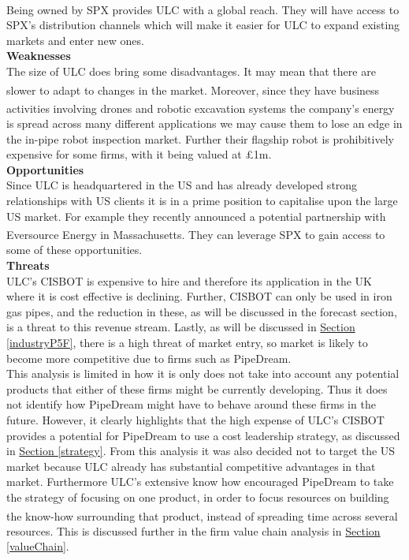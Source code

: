 \documentclass[11pt]{article}		%
\newcommand{\supercite}[1]{\textsuperscript{\cite{#1}}}		%
\newcommand{\sectref}[1]{\hyperref[#1]{Section \ref*{#1}}}     %
\begin{document}
	     \\ \hspace*{3ex}
	        Being owned by SPX provides ULC with a global reach. They will have access to SPX's distribution channels which will make it easier for ULC to expand existing markets and enter new ones.
	        \\
	        \textbf{Weaknesses}
	        \\
	        The size of ULC does bring some disadvantages. It may mean that there are slower to adapt to changes in the market\supercite{ULC_Slow}. Moreover, since they have business activities involving drones and robotic excavation systems\supercite{ULC_news} the company's energy is spread across many different applications we may cause them to lose an edge in the in-pipe robot inspection market. Further their flagship robot is prohibitively expensive for some firms, with it being valued at £1m.
	        \\
	        \textbf{Opportunities}
	        \\
	        Since ULC is headquartered in the US and has already developed strong relationships with US clients it is in a prime position to capitalise upon the large US market. For example they recently announced a potential partnership with Eversource Energy in Massachusetts\supercite{ULC_news}. They can leverage SPX to gain access to some of these opportunities.
	        \\
	        \textbf{Threats}
	        \\
	        ULC's CISBOT is expensive to hire and therefore its application in the UK where it is cost effective is declining. Further, CISBOT can only be used in iron gas pipes, and the reduction in these, as will be discussed in the forecast section, is a threat to this revenue stream. Lastly, as will be discussed in \sectref{industryP5F}, there is a high threat of market entry, so market is likely to become more competitive due to firms such as PipeDream.
\\ \hspace*{3ex}
            This analysis is limited in how it is only does not take into account any potential products that either of these firms might be currently developing. Thus it does not identify how PipeDream might have to behave around these firms in the future. However, it clearly highlights that the high expense of ULC's CISBOT provides a potential for PipeDream to use a cost leadership strategy, as discussed in \sectref{strategy}. From this analysis it was also decided not to target the US market because ULC already has substantial competitive advantages in that market. Furthermore ULC's extensive know how encouraged PipeDream to take the strategy of focusing on one product, in order to focus resources on building the know-how surrounding that product\supercite{Barney}, instead of spreading time across several resources. This is discussed further in the firm value chain analysis in \sectref{valueChain}.
\end{document}
